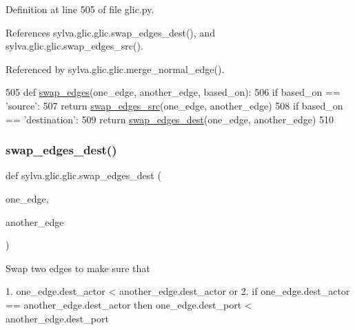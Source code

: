 Definition at line 505 of file glic.\+py.



References sylva.\+glic.\+glic.\+swap\+\_\+edges\+\_\+dest(), and sylva.\+glic.\+glic.\+swap\+\_\+edges\+\_\+src().



Referenced by sylva.\+glic.\+glic.\+merge\+\_\+normal\+\_\+edge().


\begin{DoxyCode}
505   \textcolor{keyword}{def }\hyperlink{namespacesylva_1_1glic_1_1glic_aa33f0fa18db2dc181313352cfdbc0cca}{swap\_edges}(one\_edge, another\_edge, based\_on):
506     \textcolor{keywordflow}{if} based\_on == \textcolor{stringliteral}{'source'}:
507       \textcolor{keywordflow}{return} \hyperlink{namespacesylva_1_1glic_1_1glic_a6e0ff8a8e5ef9956ef0b31be0fb0bf0e}{swap\_edges\_src}(one\_edge, another\_edge)
508     \textcolor{keywordflow}{if} based\_on == \textcolor{stringliteral}{'destination'}:
509       \textcolor{keywordflow}{return} \hyperlink{namespacesylva_1_1glic_1_1glic_a478b14bc177ffdfb87bc422a3e2fa0f1}{swap\_edges\_dest}(one\_edge, another\_edge)
510 
\end{DoxyCode}
\mbox{\label{namespacesylva_1_1glic_1_1glic_a478b14bc177ffdfb87bc422a3e2fa0f1}} 
\subsubsection{\texorpdfstring{swap\+\_\+edges\+\_\+dest()}{swap\_edges\_dest()}}
{\footnotesize\ttfamily def sylva.\+glic.\+glic.\+swap\+\_\+edges\+\_\+dest (\begin{DoxyParamCaption}\item[{}]{one\+\_\+edge,  }\item[{}]{another\+\_\+edge }\end{DoxyParamCaption})}

\begin{DoxyVerb}  Swap two edges to make sure that

  1. one_edge.dest_actor < another_edge.dest_actor
  or
  2. if one_edge.dest_actor == another_edge.dest_actor
     then one_edge.dest_port < another_edge.dest_port
\end{DoxyVerb}
 

